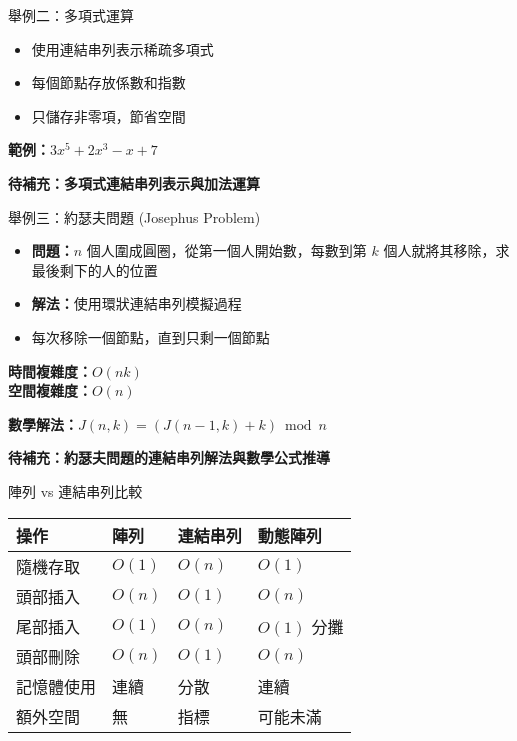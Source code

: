 \documentclass{beamer}
\begin{document}
\begin{frame}{舉例二：多項式運算}
\begin{itemize}
    \item 使用連結串列表示稀疏多項式
    \item 每個節點存放係數和指數
    \item 只儲存非零項，節省空間
\end{itemize}

\vspace{1em}
\textbf{範例：}$3x^5 + 2x^3 - x + 7$

\vspace{1em}
\begin{center}
\textbf{待補充：多項式連結串列表示與加法運算}
\end{center}
\end{frame}

\begin{frame}{舉例三：約瑟夫問題 (Josephus Problem)}
\begin{itemize}
    \item \textbf{問題：}$n$ 個人圍成圓圈，從第一個人開始數，每數到第 $k$ 個人就將其移除，求最後剩下的人的位置
    \item \textbf{解法：}使用環狀連結串列模擬過程
    \item 每次移除一個節點，直到只剩一個節點
\end{itemize}

\vspace{1em}
\textbf{時間複雜度：}$O(nk)$\\
\textbf{空間複雜度：}$O(n)$

\vspace{1em}
\textbf{數學解法：}$J(n, k) = (J(n-1, k) + k) \bmod n$

\vspace{1em}
\textbf{待補充：約瑟夫問題的連結串列解法與數學公式推導}
\end{frame}

\begin{frame}{陣列 vs 連結串列比較}
\begin{center}
\renewcommand{\arraystretch}{1.4}
\begin{tabular}{|>{\centering\arraybackslash}m{2.5cm}|>{\centering\arraybackslash}m{2cm}|>{\centering\arraybackslash}m{2cm}|>{\centering\arraybackslash}m{2.5cm}|}
\hline
\textbf{操作} & \textbf{陣列} & \textbf{連結串列} & \textbf{動態陣列} \\
\hline
隨機存取 & $O(1)$ & $O(n)$ & $O(1)$ \\
\hline
頭部插入 & $O(n)$ & $O(1)$ & $O(n)$ \\
\hline
尾部插入 & $O(1)$ & $O(n)$ & $O(1)$ 分攤 \\
\hline
頭部刪除 & $O(n)$ & $O(1)$ & $O(n)$ \\
\hline
記憶體使用 & 連續 & 分散 & 連續 \\
\hline
額外空間 & 無 & 指標 & 可能未滿 \\
\hline
\end{tabular}
\end{center}
\end{frame}
\end{document}
